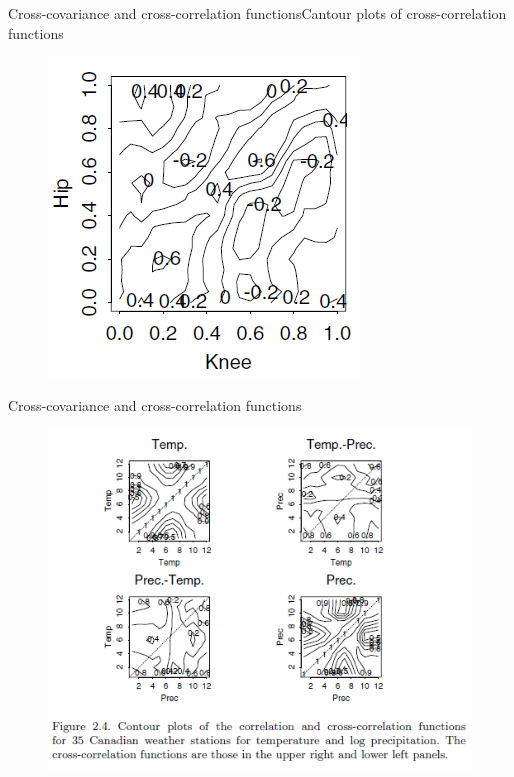 \documentclass{beamer}
\begin{document}
\begin{frame}{Cross-covariance and cross-correlation functions}{Cantour plots of cross-correlation functions}
\begin{multicols}{2}
\begin{figure}[h]
\begin{center}
			\includegraphics[width=0.9\linewidth]{img/9.png}
		\end{center}
		\label{fig:long}
		\label{fig:onecol}
	\end{figure}
\end{multicols}
\end{frame}


\begin{frame}{Cross-covariance and cross-correlation functions}
\begin{figure}[h] %
	\begin{center}
		\includegraphics[width=0.75\linewidth]{img/4.png}
	\end{center}
	\label{fig:long}
	\label{fig:onecol}
\end{figure}
\end{frame}
\end{document}
